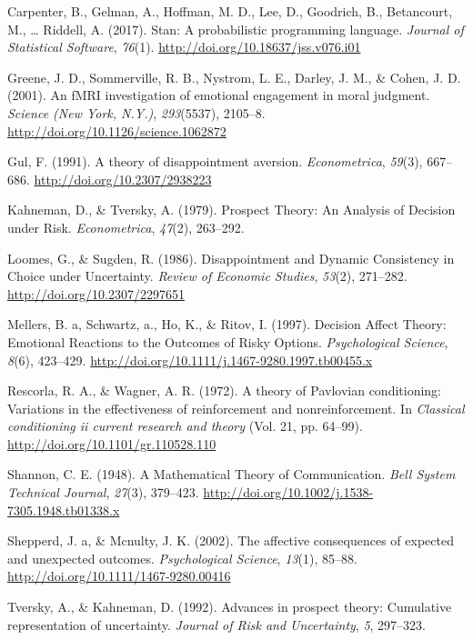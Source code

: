 \documentclass[10pt, letterpaper]{article}
\begin{document}
\hypertarget{ref-Carpenter2017}{}
Carpenter, B., Gelman, A., Hoffman, M. D., Lee, D., Goodrich, B.,
Betancourt, M., \ldots{} Riddell, A. (2017). Stan: A probabilistic
programming language. \emph{Journal of Statistical Software},
\emph{76}(1). \url{http://doi.org/10.18637/jss.v076.i01}

\hypertarget{ref-Greene2001}{}
Greene, J. D., Sommerville, R. B., Nystrom, L. E., Darley, J. M., \&
Cohen, J. D. (2001). An fMRI investigation of emotional engagement in
moral judgment. \emph{Science (New York, N.Y.)}, \emph{293}(5537),
2105--8. \url{http://doi.org/10.1126/science.1062872}

\hypertarget{ref-Gul1991}{}
Gul, F. (1991). A theory of disappointment aversion.
\emph{Econometrica}, \emph{59}(3), 667--686.
\url{http://doi.org/10.2307/2938223}

\hypertarget{ref-Kahneman1979}{}
Kahneman, D., \& Tversky, A. (1979). Prospect Theory: An Analysis of
Decision under Risk. \emph{Econometrica}, \emph{47}(2), 263--292.

\hypertarget{ref-Loomes1986}{}
Loomes, G., \& Sugden, R. (1986). Disappointment and Dynamic Consistency
in Choice under Uncertainty. \emph{Review of Economic Studies},
\emph{53}(2), 271--282. \url{http://doi.org/10.2307/2297651}

\hypertarget{ref-Mellers1997}{}
Mellers, B. a, Schwartz, a., Ho, K., \& Ritov, I. (1997). Decision
Affect Theory: Emotional Reactions to the Outcomes of Risky Options.
\emph{Psychological Science}, \emph{8}(6), 423--429.
\url{http://doi.org/10.1111/j.1467-9280.1997.tb00455.x}

\hypertarget{ref-Rescorla1972}{}
Rescorla, R. A., \& Wagner, A. R. (1972). A theory of Pavlovian
conditioning: Variations in the effectiveness of reinforcement and
nonreinforcement. In \emph{Classical conditioning ii current research
and theory} (Vol. 21, pp. 64--99).
\url{http://doi.org/10.1101/gr.110528.110}

\hypertarget{ref-Shannon1948}{}
Shannon, C. E. (1948). A Mathematical Theory of Communication.
\emph{Bell System Technical Journal}, \emph{27}(3), 379--423.
\url{http://doi.org/10.1002/j.1538-7305.1948.tb01338.x}

\hypertarget{ref-Shepperd2002}{}
Shepperd, J. a, \& Mcnulty, J. K. (2002). The affective consequences of
expected and unexpected outcomes. \emph{Psychological Science},
\emph{13}(1), 85--88. \url{http://doi.org/10.1111/1467-9280.00416}

\hypertarget{ref-Tversky1992}{}
Tversky, A., \& Kahneman, D. (1992). Advances in prospect theory:
Cumulative representation of uncertainty. \emph{Journal of Risk and
Uncertainty}, \emph{5}, 297--323.
\end{document}

